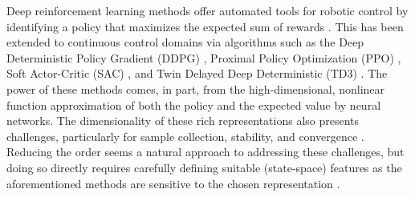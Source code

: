 \documentclass[letterpaper, 10 pt, conference]{ieeeconf}
\begin{document}
Deep reinforcement learning methods offer automated tools for robotic control by identifying a policy that maximizes the expected sum of rewards \cite{henderson2018deep}.
This has been extended to continuous control domains via algorithms such as the Deep Deterministic Policy Gradient (DDPG) \cite{DDPG}, Proximal Policy Optimization (PPO) \cite{PPO}, Soft Actor-Critic (SAC) \cite{SAC}, and Twin Delayed Deep Deterministic (TD3) \cite{TD3}.
The power of these methods comes, in part, from the high-dimensional, nonlinear function approximation of both the policy and the expected value by neural networks.
The dimensionality of these rich representations also presents challenges, particularly for sample collection, stability, and convergence \cite{Islam2017}.
Reducing the order seems a natural approach to addressing these challenges, but doing so directly requires carefully defining suitable (state-space) features as the aforementioned methods are sensitive to the chosen representation \cite{bhatnagar2009convergent}.  
\end{document}
